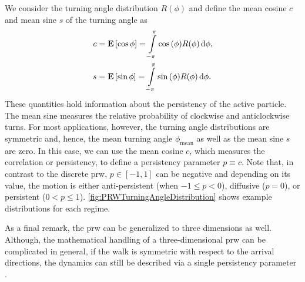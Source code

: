 We consider the turning angle distribution $R(\phi)$ and define the mean cosine $c$ and mean sine $s$ of the turning angle as
\begin{equation*}
 \begin{aligned}
  c &= \operatorname{\mathbf{E}}\left[\cos{\phi}\right] = \int\limits_{-\pi}^\pi \cos{(\phi)} R(\phi) \mathop{}\!\mathrm{d} \phi,
  \\
  s &= \operatorname{\mathbf{E}}\left[\sin{\phi}\right] = \int\limits_{-\pi}^\pi \sin{(\phi)} R(\phi) \mathop{}\!\mathrm{d} \phi.
 \end{aligned}
\end{equation*}
These quantities hold information about the persistency of the active particle. The mean sine measures the relative probability of clockwise and anticlockwise turns. For most applications, however, the turning angle distributions are symmetric and, hence, the mean turning angle $\phi_{\textrm{mean}}$ as well as the mean sine $s$ are zero. In this case, we can use the mean cosine $c$, which measures the correlation or persistency, to define a persistency parameter $p \equiv c$. Note that, in contrast to the discrete \ac{prw}, $p\in[-1,1]$ can be negative and depending on its value, the motion is either anti-persistent (when $-1 \leq p < 0$), diffusive ($p=0$), or persistent ($0<p\leq1$). \autoref{fig:PRWTurningAngleDistribution} shows example distributions for each regime.

As a final remark, the \ac{prw} can be generalized to three dimensions as well. Although, the mathematical handling of a three-dimensional \ac{prw} can be complicated in general, if the walk is symmetric with respect to the arrival directions, the dynamics can still be described via a single persistency parameter \cite{sadjadi:2015}.




